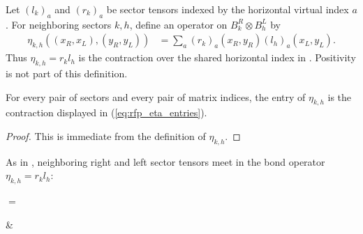 \begin{definition}
    \label{def:mpdo_eta_of_sector_tensors}
    \leanok
    Let $(l_k)_a$ and $(r_k)_a$ be sector tensors indexed by the horizontal
    virtual index $a$. For neighboring sectors $k,h$, define an operator on
    $B_k^R\otimes B_h^L$ by
    \begin{align}
        \eta_{k,h}((x_R,x_L),(y_R,y_L))
         & =\sum_a (r_k)_a(x_R,y_R)(l_h)_a(x_L,y_L).
        \label{eq:rfp_eta_entries}
    \end{align}
    Thus $\eta_{k,h}=r_k l_h$ is the contraction over the shared horizontal
    index in
    \cite[Appendix~C.2, equation~\textup{(etarl)}]{Cirac2016MPDO_arXiv}.
    Positivity is not part of this definition.
\end{definition}

\begin{lemma}
    \label{lem:mpdo_eta_of_sector_tensors_apply}
    \leanok
    For every pair of sectors and every pair of matrix indices, the entry of
    $\eta_{k,h}$ is the contraction displayed
    in (\ref{eq:rfp_eta_entries}).
\end{lemma}

\begin{proof}
    \leanok
    This is immediate from the definition of $\eta_{k,h}$.
\end{proof}

As in \cite[Appendix~C.2, lines~1441--1445]{Cirac2016MPDO_arXiv},
neighboring right and left sector tensors meet in the bond operator
$\eta_{k,h}=r_k l_h$:
\begin{center}
    \tenkzkernel
    \begin{tenkz}[rows={wire}, cols=2, west=none, east=none]
    \end{tenkz}
    $ = $
    \begin{tenkz}[rows={wire}, cols=2, west=none, east=none]
         &
    \end{tenkz}
\end{center}

